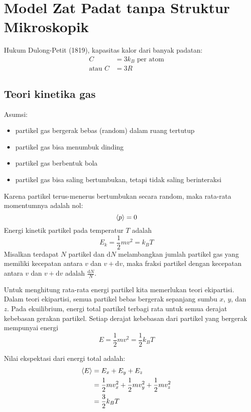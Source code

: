 \chapter{Model Zat Padat tanpa Struktur Mikroskopik}

Hukum Dulong-Petit (1819), kapasitas kalor dari banyak padatan:
\begin{align}
C & = 3k_{B}\,\,\text{per atom} \\
\text{atau}\,\, C & = 3R
\end{align}


\section{Teori kinetika gas}
Asumsi:
\begin{itemize}
\item partikel gas bergerak bebas (random) dalam ruang tertutup
\item partikel gas bisa menumbuk dinding
\item partikel gas berbentuk bola
\item partikel gas bisa saling bertumbukan, tetapi tidak saling berinteraksi
\end{itemize}

Karena partikel terus-menerus bertumbukan secara random, maka rata-rata momentumnya
adalah nol:
\begin{equation}
\braket{p} = 0
\end{equation}
Energi kinetik partikel pada temperatur $T$ adalah
\begin{equation}
E_{k} = \frac{1}{2} m v^2 = k_{B} T
\end{equation}
Misalkan terdapat $N$ partikel dan $\mathrm{d}N$ melambangkan jumlah partikel
gas yang memiliki kecepatan antara $v$ dan $v + \mathrm{d}v$, maka fraksi partikel
dengan kecepatan antara $v$ dan $v + \mathrm{d}v$ adalah $\frac{\mathrm{d}N}{N}$.

Untuk menghitung rata-rata energi partikel kita memerlukan teori ekipartisi. Dalam teori
ekipartisi, semua partikel bebas bergerak sepanjang sumbu $x$, $y$, dan $z$.
Pada ekuilibrium, energi total partikel terbagi rata untuk semua derajat kebebasan
gerakan partikel. Setiap derajat kebebasan dari partikel yang bergerak mempunyai energi
\begin{equation*}
E = \frac{1}{2} m v^2 = \frac{1}{2} k_{B} T
\end{equation*}

Nilai ekspektasi dari energi total adalah:
\begin{align*}
\braket{E} & = E_{x} + E_{y} + E_{z} \\
& = \frac{1}{2} m v_{x}^2 + \frac{1}{2} m v_{y}^2 + \frac{1}{2} m v_{z}^2 \\
& = \frac{3}{2} k_{B} T
\end{align*}

